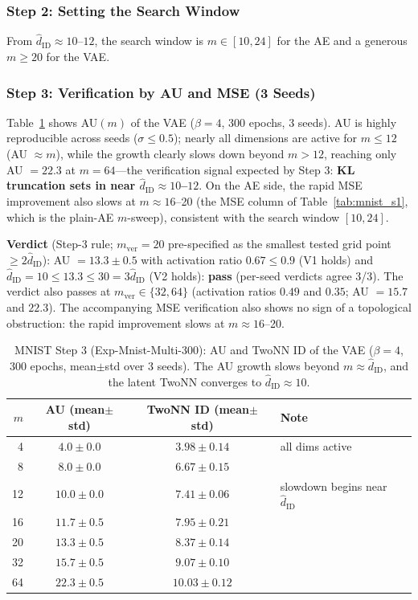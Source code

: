 \documentclass[make,article,submit,pdftex,moreauthors]{Definitions/mdpi}
\newcommand{\hatdID}{\hat{d}_{\mathrm{ID}}}
\begin{document}
\subsubsection{Step 2: Setting the Search Window}

From $\hatdID \approx 10$--$12$, the search window is $m \in [10, 24]$
for the AE and a generous $m \geq 20$ for the VAE.

\subsubsection{Step 3: Verification by AU and MSE (3 Seeds)}

Table~\ref{tab:mnist_s3} shows AU$(m)$ of the VAE ($\beta = 4$, 300 epochs,
3 seeds).
AU is highly reproducible across seeds ($\sigma \leq 0.5$); nearly all
dimensions are active for $m \leq 12$ (AU $\approx m$), while the growth
clearly slows down beyond $m > 12$, reaching only AU $= 22.3$ at
$m = 64$---the verification signal expected by Step 3:
\textbf{KL truncation sets in near $\hatdID \approx 10$--$12$}.
On the AE side, the rapid MSE improvement also slows at
$m \approx 16$--20 (the MSE column of Table~\ref{tab:mnist_s1}, which is the
plain-AE $m$-sweep), consistent with the search window $[10, 24]$.

\textbf{Verdict} (Step-3 rule; $m_{\mathrm{ver}} = 20$ pre-specified as the
smallest tested grid point $\geq 2\hatdID$): AU $= 13.3 \pm 0.5$ with
activation ratio $0.67 \leq 0.9$ (V1 holds) and
$\hatdID = 10 \leq 13.3 \leq 30 = 3\hatdID$ (V2 holds): \textbf{pass}
(per-seed verdicts agree 3/3).
The verdict also passes at $m_{\mathrm{ver}} \in \{32, 64\}$
(activation ratios $0.49$ and $0.35$; AU $= 15.7$ and $22.3$).
The accompanying MSE verification also shows no sign of a topological
obstruction: the rapid improvement slows at $m \approx 16$--20.

\begin{table}[H]
\caption{MNIST Step 3 (Exp-Mnist-Multi-300): AU and TwoNN ID of the VAE
($\beta = 4$, 300 epochs, mean$\pm$std over 3 seeds). The AU growth slows
beyond $m \approx \hatdID$, and the latent TwoNN converges to
$\hatdID \approx 10$.}
\label{tab:mnist_s3}
\small
\begin{tabular}{rccl}
\toprule
$m$ & \textbf{AU (mean$\pm$std)} & \textbf{TwoNN ID (mean$\pm$std)} & \textbf{Note} \\
\midrule
 4 & $4.0 \pm 0.0$ & $3.98 \pm 0.14$ & all dims active \\
 8 & $8.0 \pm 0.0$ & $6.67 \pm 0.15$ & \\
12 & $10.0 \pm 0.0$ & $7.41 \pm 0.06$ & slowdown begins near $\hatdID$ \\
16 & $11.7 \pm 0.5$ & $7.95 \pm 0.21$ & \\
20 & $13.3 \pm 0.5$ & $8.37 \pm 0.14$ & \\
32 & $15.7 \pm 0.5$ & $9.07 \pm 0.10$ & \\
64 & $22.3 \pm 0.5$ & $10.03 \pm 0.12$ & \\
\bottomrule
\end{tabular}
\end{table}
\end{document}
